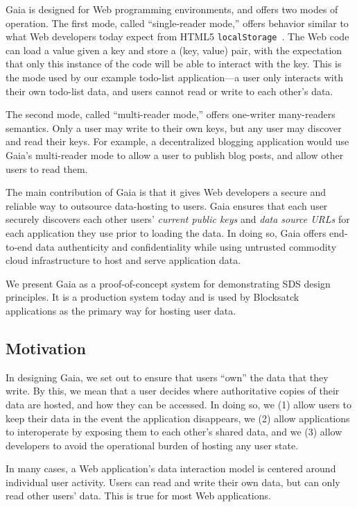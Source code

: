 Gaia is designed for Web programming environments, and offers two
modes of operation.  The first mode, called ``single-reader mode,'' offers
behavior similar to what Web developers today expect from HTML5
\texttt{localStorage}~\cite{w3c-localstorage}.  The Web code can load a value
given a key and store a (key, value) pair, with the expectation that only this
instance of the code will be able to interact with the key.  This is the mode
used by our example todo-list application---a user only interacts with their own
todo-list data, and users cannot read or write to each other's data.

The second mode, called ``multi-reader mode,'' offers one-writer many-readers
semantics.  Only a user may write to their own keys, but any user may discover
and read their keys.  For example, a decentralized blogging application would
use Gaia's multi-reader mode to allow a user to publish blog posts, and allow
other users to read them.

The main contribution of Gaia is that it gives Web developers a secure and
reliable way to outsource data-hosting to users.  Gaia ensures that each user
securely discovers each other users' \emph{current public keys} and \emph{data
source URLs} for each application they use prior to loading the data.
In doing so, Gaia offers end-to-end
data authenticity and confidentiality while using untrusted commodity cloud infrastructure
to host and serve application data.

We present Gaia as a proof-of-concept system for demonstrating SDS design
principles.  It is a production system today and is used by
Blocksatck~\cite{blockstack} applications as the primary way for hosting user data.

\subsection{Motivation}

In designing Gaia, we set out to ensure that users ``own'' the data that they
write.  By this, we mean that a user decides where authoritative
copies of their data are hosted, and how they can be accessed.  In doing so, we 
(1) allow users to keep their data in the event the application disappears, we
(2) allow applications to interoperate by exposing them to each
other's shared data, and we (3) allow developers to avoid the operational burden of
hosting any user state.

In many cases, a Web application's data interaction model is centered around
individual user activity.  Users can read and write their own data, but can
only read other users' data.  This is true for most Web applications.

